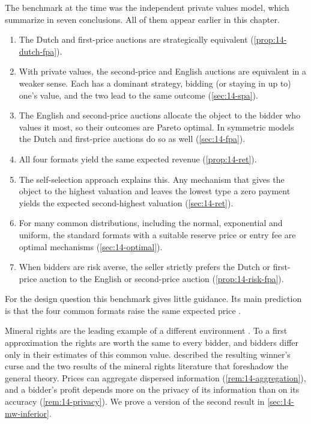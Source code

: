 The benchmark at the time was the independent private values model, which
\citet[pp.~1090--1093]{MilgromWeber1982} summarize in seven conclusions. All of them appear earlier in this
chapter.
\begin{enumerate}[label=(\arabic*)]
  \item The Dutch and first-price auctions are strategically equivalent (\cref{prop:14-dutch-fpa}).
  \item With private values, the second-price and English auctions are equivalent in a weaker sense. Each has
  a dominant strategy, bidding (or staying in up to) one's value, and the two lead to the same outcome
  (\cref{sec:14-spa}).
  \item The English and second-price auctions allocate the object to the bidder who values it most, so their
  outcomes are Pareto optimal. In symmetric models the Dutch and first-price auctions do so as well
  (\cref{sec:14-fpa}).
  \item All four formats yield the same expected revenue (\cref{prop:14-ret}).
  \item The self-selection approach explains this. Any mechanism that gives the object to the highest
  valuation and leaves the lowest type a zero payment yields the expected second-highest valuation
  (\cref{sec:14-ret}).
  \item For many common distributions, including the normal, exponential and uniform, the standard formats
  with a suitable reserve price or entry fee are optimal mechanisms (\cref{sec:14-optimal}).
  \item When bidders are risk averse, the seller strictly prefers the Dutch or first-price auction to the
  English or second-price auction (\cref{prop:14-risk-fpa}).
\end{enumerate}
For the design question this benchmark gives little guidance. Its main prediction is that the four common
formats raise the same expected price \citep[p.~1095]{MilgromWeber1982}.

Mineral rights are the leading example of a different environment \citep[Section~2.2]{MilgromWeber1982}.
To a first approximation the rights are worth the same to every bidder, and bidders differ only in their
estimates of this common value.  described the resulting winner's curse and the
two results of the mineral rights literature that foreshadow the general theory. Prices can aggregate
dispersed information (\cref{rem:14-aggregation}), and a bidder's profit depends more on the privacy of its
information than on its accuracy (\cref{rem:14-privacy}). We prove a version of the second result in
\cref{sec:14-mw-inferior}.

